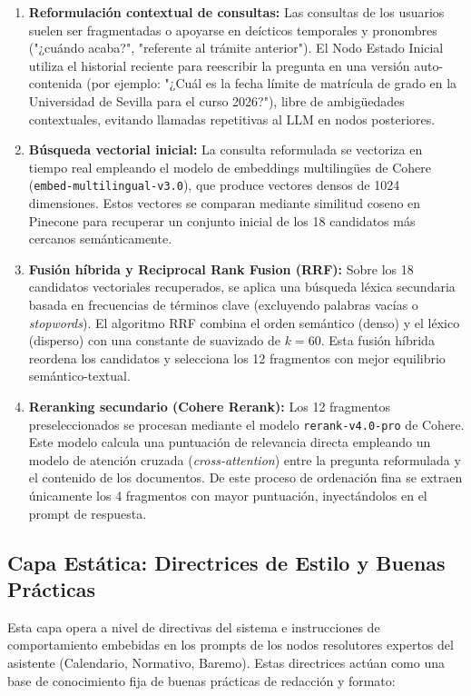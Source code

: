 \documentclass[12pt,a4paper,oneside]{report}
\begin{document}
\begin{enumerate}
    \item \textbf{Reformulación contextual de consultas:} Las consultas de los usuarios suelen ser fragmentadas o apoyarse en deícticos temporales y pronombres ("¿cuándo acaba?", "referente al trámite anterior"). El Nodo Estado Inicial utiliza el historial reciente para reescribir la pregunta en una versión auto-contenida (por ejemplo: "¿Cuál es la fecha límite de matrícula de grado en la Universidad de Sevilla para el curso 2026?"), libre de ambigüedades contextuales, evitando llamadas repetitivas al LLM en nodos posteriores.
    \item \textbf{Búsqueda vectorial inicial:} La consulta reformulada se vectoriza en tiempo real empleando el modelo de embeddings multilingües de Cohere (\texttt{embed-multilingual-v3.0}), que produce vectores densos de 1024 dimensiones. Estos vectores se comparan mediante similitud coseno en Pinecone para recuperar un conjunto inicial de los 18 candidatos más cercanos semánticamente.
    \item \textbf{Fusión híbrida y Reciprocal Rank Fusion (RRF):} Sobre los 18 candidatos vectoriales recuperados, se aplica una búsqueda léxica secundaria basada en frecuencias de términos clave (excluyendo palabras vacías o \textit{stopwords}). El algoritmo RRF combina el orden semántico (denso) y el léxico (disperso) con una constante de suavizado de $k=60$. Esta fusión híbrida reordena los candidatos y selecciona los 12 fragmentos con mejor equilibrio semántico-textual.
    \item \textbf{Reranking secundario (Cohere Rerank):} Los 12 fragmentos preseleccionados se procesan mediante el modelo \texttt{rerank-v4.0-pro} de Cohere. Este modelo calcula una puntuación de relevancia directa empleando un modelo de atención cruzada (\textit{cross-attention}) entre la pregunta reformulada y el contenido de los documentos. De este proceso de ordenación fina se extraen únicamente los 4 fragmentos con mayor puntuación, inyectándolos en el prompt de respuesta.
\end{enumerate}

\subsection*{Capa Estática: Directrices de Estilo y Buenas Prácticas}

Esta capa opera a nivel de directivas del sistema e instrucciones de comportamiento embebidas en los prompts de los nodos resolutores expertos del asistente (Calendario, Normativo, Baremo). Estas directrices actúan como una base de conocimiento fija de buenas prácticas de redacción y formato:
\end{document}
